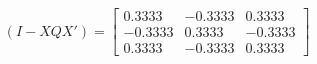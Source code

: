 

\[
(I - XQX') = \left[ \begin{array}{rrr}
0.3333 & -0.3333 & 0.3333 \\
-0.3333 & 0.3333 & -0.3333 \\
0.3333 & -0.3333 & 0.3333
\end{array} \right]
\]


